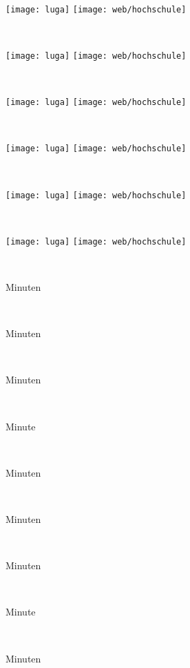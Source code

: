 \documentclass[a4paper,ngerman,landscape,30pt]{scrartcl}
\begin{document}
\newcommand{\page}[2]{
  \
  \begin{center}
    \vfill%
    \Huge\sffamily%
    \textbf{\scalebox{#1}{#2}}%
    \vfill
    \texttt{[image: luga]}\quad
    \texttt{[image: web/hochschule]}
    \vfill
  \end{center}
  \newpage
}

\newcommand{\timeoutpage}[1]{
  \
  \begin{center}
    \vfill%
    \Huge\sffamily%
    \textbf{\scalebox{7}{#1}}%
    \vfill
    Minuten
    \vfill
  \end{center}
  \newpage
}

\newcommand{\timeoutpages}{
  \
  \begin{center}
    \vfill%
    \Huge\sffamily%
    \textbf{\scalebox{7}{1}}%
    \vfill
    Minute
    \vfill
  \end{center}
  \newpage
}

\page{2.4}{Raum A}
\page{2.4}{Raum B}
\page{2.4}{Raum C}
\page{2.4}{Raum D}
\page{2.4}{Raum E}
\page{2.4}{Raum F}

\timeoutpage{15}
\timeoutpage{8}
\timeoutpage{4}
\timeoutpages

\timeoutpage{4}
\timeoutpage{3}
\timeoutpage{2}
\timeoutpages
\timeoutpage{0}
\end{document}
